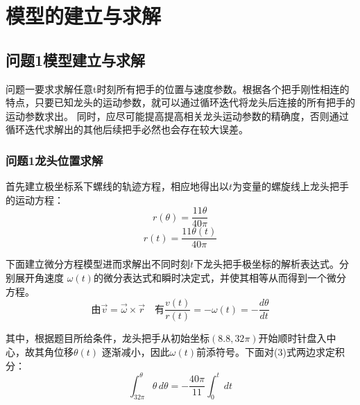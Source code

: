 \documentclass{cumcmthesis1}
\begin{document}
\section{模型的建立与求解}
\subsection{\textbf{问题1}模型建立与求解}
\par
问题一要求求解任意t时刻所有把手的位置与速度参数。根据各个把手刚性相连的特点，只要已知龙头的运动参数，就可以通过循环迭代将龙头后连接的所有把手的运动参数求出。
同时，应尽可能提高提高相关龙头运动参数的精确度，否则通过循环迭代求解出的其他后续把手必然也会存在较大误差。
\subsubsection{\textbf{问题1}龙头位置求解}
\par
首先建立极坐标系下螺线的轨迹方程，相应地得出以$t$为变量的螺旋线上龙头把手的运动方程：
\begin{equation}
r(\theta)=\frac{11 \theta}{40 \pi}
\end{equation}
\begin{equation}
    r(t)=\frac{11 \theta(t)}{40 \pi} 
\end{equation}
\par
下面建立微分方程模型进而求解出不同时刻$t$下龙头把手极坐标的解析表达式。分别展开角速度
$\omega (t)$的微分表达式和瞬时决定式，并使其相等从而得到一个微分方程。
\begin{equation}
    \text{由}\vec{v}=\vec{\omega} \times \vec{r} \quad \text{有}       \frac{v(t)}{r(t)}=-\omega (t)=-\frac{d \theta}{dt}
\end{equation}
\par
其中，根据题目所给条件，龙头把手从初始坐标$(8.8,32\pi)$开始顺时针盘入中心，故其角位移$\theta(t)$
逐渐减小，因此$\omega (t)$前添符号。下面对(3)式两边求定积分：
\begin{equation}
\int_{32 \pi}^{\theta}  \theta \,d\theta =-\frac{40 \pi}{11}\int_{0}^{t}  \,dt 
\end{equation}
\end{document}
